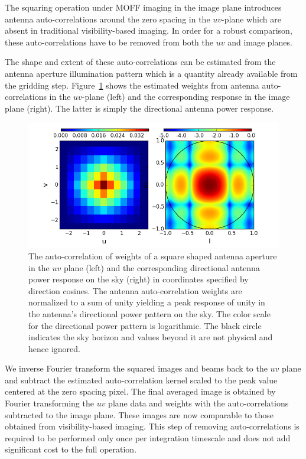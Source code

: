 \documentclass[a4paper,fleqn,usenatbib]{../mnras}
\begin{document}
The squaring operation under MOFF imaging in the image plane introduces antenna 
auto-correlations around the zero spacing in the $uv$-plane which are absent in 
traditional visibility-based imaging. In order for a robust comparison, these 
auto-correlations have to be removed from both the $uv$ and image planes. 

The shape and extent of these auto-correlations can be estimated from the 
antenna aperture illumination pattern which is a quantity already available 
from the gridding step. Figure~\ref{fig:autocorr_wts_PB} shows the estimated 
weights from antenna auto-correlations in the $uv$-plane (left) and the 
corresponding response in the image plane (right). The latter is simply the 
directional antenna power response. 

\begin{figure}
  \includegraphics[width=\columnwidth]{autocorr_uvwts_pbeam.png}
  \caption{The auto-correlation of weights of a square shaped antenna aperture
    in the $uv$ plane (left) and the corresponding directional antenna power 
    response on the sky (right) in coordinates specified by direction cosines. 
    The antenna auto-correlation weights are normalized to a sum
    of unity yielding a peak response of unity in the antenna's directional
    power pattern on the sky. The color scale for the directional power 
    pattern is logarithmic. The black circle indicates the sky horizon and
    values beyond it are not physical and hence ignored.}
  \label{fig:autocorr_wts_PB}
\end{figure}

We inverse Fourier transform the squared 
images and beams back to the $uv$ plane and subtract the estimated 
auto-correlation kernel scaled to the peak value centered at the zero spacing 
pixel. The final averaged image is obtained by Fourier transforming the $uv$ 
plane data and weights with the auto-correlations subtracted to the image plane. 
These images are now comparable to those obtained from visibility-based imaging. 
This step of removing auto-correlations is required to be performed only once 
per integration timescale and does not add significant cost to the full operation.
\end{document}
